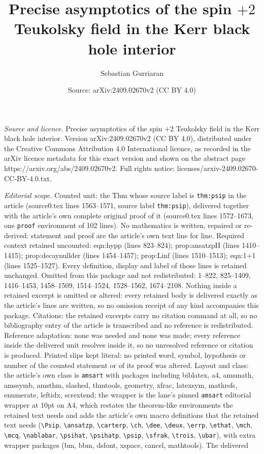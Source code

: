 \documentclass[10pt,a4paper]{amsart}
\title[Precise asymptotics of the spin $+2$ Teukolsky field in the ]{Precise asymptotics of the spin $+2$ Teukolsky field in the Kerr black hole interior}
\author{Sebastian Gurriaran}
\date{Source: arXiv:2409.02670v2 (CC BY 4.0)}
\begin{document}
\maketitle

\noindent\emph{Source and licence.} Precise asymptotics of the spin $+2$ Teukolsky field in the Kerr black hole interior. Version arXiv:2409.02670v2 (CC BY 4.0), distributed under the Creative Commons Attribution 4.0 International licence, as recorded in the arXiv licence metadata for this exact version and shown on the abstract page https://arxiv.org/abs/2409.02670v2. Full rights notice: licenses/arxiv-2409.02670-CC-BY-4.0.txt.\par\smallskip

\noindent\textit{Editorial scope.} Counted unit: the Thm whose source label is \texttt{thm:psip} in the article (source0.tex lines 1563--1571, source label \texttt{thm:psip}), delivered together with the article's own complete original proof of it (source0.tex lines 1572--1673, one \texttt{proof} environment of 102 lines). No mathematics is written, repaired or re-derived: statement and proof are the article's own text line for line. Required context retained uncounted: eqn:hypp (lines 823--824); prop:ansatzpII (lines 1410--1415); prop:decaynullder (lines 1454--1457); prop:Linf (lines 1510--1513); eqn:1+1 (lines 1525--1527). Every definition, display and label of those lines is retained unchanged. Omitted from this package and not redistributed: 1--822, 825--1409, 1416--1453, 1458--1509, 1514--1524, 1528--1562, 1674--2108. Nothing inside a retained excerpt is omitted or altered: every retained body is delivered exactly as the article's lines are written, so no omission receipt of any kind accompanies this package. Citations: the retained excerpts carry no citation command at all, so no bibliography entry of the article is transcribed and no reference is redistributed. Reference adaptation: none was needed and none was made; every reference inside the delivered unit resolves inside it, so no unresolved reference or citation is produced. Printed slips kept literal: no printed word, symbol, hypothesis or number of the counted statement or of its proof was altered. Layout and class: the article's own class is \texttt{amsart} with packages including biblatex, a4, amsmath, amssymb, amsthm, slashed, thmtools, geometry, xfrac, latexsym, mathrsfs, enumerate, leftidx, scrextend; the wrapper is the lane's pinned \texttt{amsart} editorial wrapper at 10pt on A4, which restates the theorem-like environments the retained text needs and adds the article's own macro definitions that the retained text needs (\texttt{\textbackslash Psip}, \texttt{\textbackslash ansatzp}, \texttt{\textbackslash carterp}, \texttt{\textbackslash ch}, \texttt{\textbackslash dee}, \texttt{\textbackslash deux}, \texttt{\textbackslash errp}, \texttt{\textbackslash ethat}, \texttt{\textbackslash mch}, \texttt{\textbackslash mcq}, \texttt{\textbackslash nablabar}, \texttt{\textbackslash psihat}, \texttt{\textbackslash psihatp}, \texttt{\textbackslash psip}, \texttt{\textbackslash sfrak}, \texttt{\textbackslash trois}, \texttt{\textbackslash ubar}), with extra wrapper packages (bm, bbm, dsfont, xspace, cancel, mathtools). The delivered 
\end{document}
